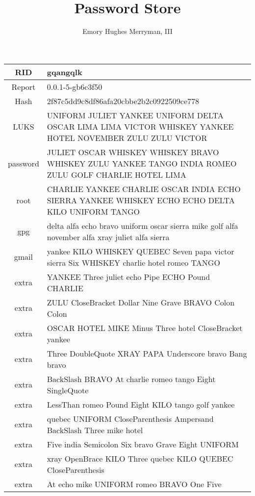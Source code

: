 \documentclass{article}
\begin{document}
\title{Password Store}
\author{Emory Hughes Merryman, III}
\maketitle
\begin{tabular}{||c|p{10cm}||}
  \hline
  RID & gqangqlk \\ \hline
  Report & 0.0.1-5-gb6c3f50 \\ \hline
  Hash & 2f87c5dd9c8df86afa20cbbe2b2c0922509ce778 \\ \hline
  LUKS & UNIFORM JULIET YANKEE UNIFORM DELTA OSCAR LIMA LIMA VICTOR WHISKEY YANKEE HOTEL NOVEMBER ZULU ZULU VICTOR \\ \hline
  password & JULIET OSCAR WHISKEY WHISKEY BRAVO WHISKEY ZULU YANKEE TANGO INDIA ROMEO ZULU GOLF CHARLIE HOTEL LIMA \\ \hline
  root & CHARLIE YANKEE CHARLIE OSCAR INDIA ECHO SIERRA YANKEE WHISKEY ECHO ECHO DELTA KILO UNIFORM TANGO \\ \hline
  gpg & delta alfa echo bravo uniform oscar sierra mike golf alfa november alfa xray juliet alfa sierra \\ \hline
  gmail & yankee KILO WHISKEY QUEBEC Seven papa victor sierra Six WHISKEY charlie hotel romeo TANGO \\ \hline
  extra & YANKEE Three juliet echo Pipe ECHO Pound CHARLIE \\ \hline
  extra & ZULU CloseBracket Dollar Nine Grave BRAVO Colon Colon \\ \hline
  extra & OSCAR HOTEL MIKE Minus Three hotel CloseBracket yankee \\ \hline
  extra & Three DoubleQuote XRAY PAPA Underscore bravo Bang bravo \\ \hline
  extra & BackSlash BRAVO At charlie romeo tango Eight SingleQuote \\ \hline
  extra & LessThan romeo Pound Eight KILO tango golf yankee \\ \hline
  extra & quebec UNIFORM CloseParenthesis Ampersand BackSlash Three mike hotel \\ \hline
  extra & Five india Semicolon Six bravo Grave Eight UNIFORM \\ \hline
  extra & xray OpenBrace KILO Three quebec KILO QUEBEC CloseParenthesis \\ \hline
  extra & At echo mike UNIFORM romeo BRAVO One Five \\ \hline
  \hline
\end{tabular}
\end{document}

